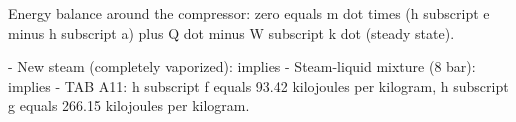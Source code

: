 Energy balance around the compressor: zero equals m dot times (h subscript e minus h subscript a) plus Q dot minus W subscript k dot (steady state).

- New steam (completely vaporized): implies
- Steam-liquid mixture (8 bar): implies
- TAB A11: h subscript f equals 93.42 kilojoules per kilogram, h subscript g equals 266.15 kilojoules per kilogram.